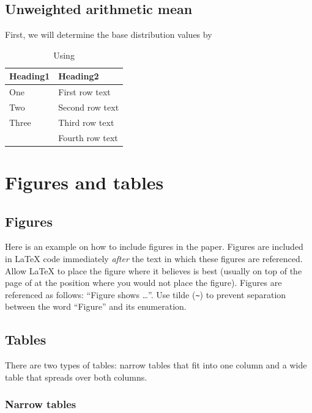 \documentclass[10pt, a4paper]{article}
\begin{document}
\subsection{Unweighted arithmetic mean}
First, we will determine the base distribution values by  
\begin{table}
\caption{Using }
\label{tab:narrow-table}
\begin{center}
\begin{tabular}{ll}
\toprule
Heading1 & Heading2 \\
\midrule
One & First row text \\
Two   & Second row text \\
Three   & Third row text \\
      & Fourth row text \\
\bottomrule
\end{tabular}
\end{center}
\end{table}

\section{Figures and tables}

\subsection{Figures}

Here is an example on how to include figures in the paper. Figures are included in \LaTeX{} code immediately \textit{after} the text in which these figures are referenced. Allow \LaTeX{} to place the figure where it believes is best (usually on top of the page of at the position where you would not place the figure). Figures are referenced as follows: ``Figure shows \dots''. Use tilde (\verb.~.) to prevent separation between the word ``Figure'' and its enumeration. 

\subsection{Tables}

There are two types of tables: narrow tables that fit into one column and a wide table that spreads over both columns.

\subsubsection{Narrow tables}
\end{document}
